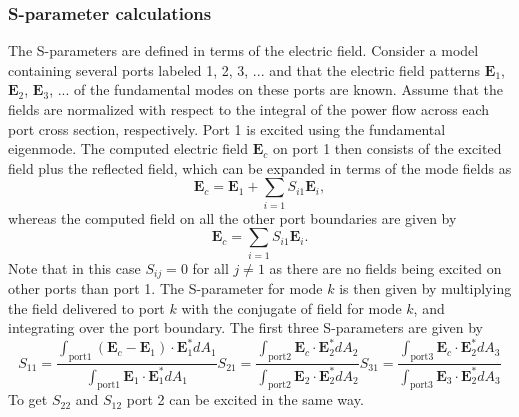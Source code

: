 \subsubsection*{S-parameter calculations}
The S-parameters are defined in terms of the electric field. Consider a model containing several ports labeled 1, 2, 3, ... and that the electric field patterns $\mathbf{E}_1$, $\mathbf{E}_2$, $\mathbf{E}_3$, ... of the fundamental modes on these ports are known. Assume that the fields are normalized with respect to the integral of the power flow across each port cross section, respectively. Port 1 is excited using the fundamental eigenmode. The computed electric field $\mathbf{E}_c$ on port 1 then consists of the excited field plus the reflected field, which can be expanded in terms of the mode fields as\cite{FEM_in_EM_jianming_jin}
\begin{equation}
    \mathbf{E}_c = \mathbf{E}_1 + \sum_{i=1}S_{i1}\mathbf{E}_i,
\end{equation}
whereas the computed field on all the other port boundaries are given by
\begin{equation}
    \mathbf{E}_c = \sum_{i=1}S_{i1}\mathbf{E}_i.
\end{equation}
Note that in this case $S_{ij}=0$ for all $j\neq1$ as there are no fields being excited on other ports than port 1. The S-parameter for mode $k$ is then given by multiplying the field delivered to port $k$ with the conjugate of field for mode $k$, and integrating over the port boundary. The first three S-parameters are given by \cite{comsol_waveopticsmodule}
\begin{subequations}
\begin{equation}
    S_{11} = \frac{\int_{\text{port} 1} (\mathbf{E}_c-\mathbf{E}_1)\cdot \mathbf{E}_1^*dA_1}{\int_{\text{port} 1} \mathbf{E}_1\cdot\mathbf{E}_1^*dA_1}
\end{equation}
\begin{equation}
    S_{21} = \frac{\int_{\text{port} 2} \mathbf{E}_c \cdot \mathbf{E}_2^*dA_2}{\int_{\text{port} 2} \mathbf{E}_2\cdot\mathbf{E}_2^*dA_2} 
\end{equation}
\begin{equation}
    S_{31} = \frac{\int_{\text{port} 3} \mathbf{E}_c \cdot \mathbf{E}_2^*dA_3}{\int_{\text{port} 3} \mathbf{E}_3\cdot\mathbf{E}_2^*dA_3} 
\end{equation}
\end{subequations}
To get $S_{22}$ and $S_{12}$ port 2 can be excited in the same way.

